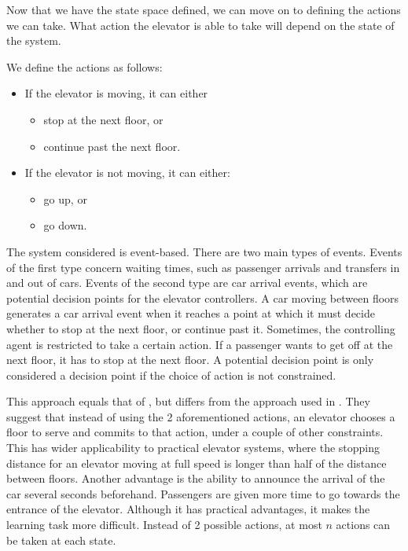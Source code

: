 Now that we have the state space defined, we can move on to defining the actions we can take. What action the elevator is able to take will depend on the state of the system.

We define the actions as follows:

\begin{itemize}
    \item If the elevator is moving, it can either
        \begin{itemize}
            \item stop at the next floor, or
            \item continue past the next floor.
        \end{itemize}

    \item If the elevator is not moving, it can either:
        \begin{itemize}
            \item go up, or
            \item go down.
        \end{itemize}
\end{itemize}

The system considered is event-based. There are two main types of events. Events of the first type concern waiting times, such as passenger arrivals and transfers in and out of cars. Events of the second type are car arrival events, which are potential decision points for the elevator controllers. A car moving between floors generates a car arrival event when it reaches a point at which it must decide whether to stop at the next floor, or continue past it. Sometimes, the controlling agent is restricted to take a certain action. If a passenger wants to get off at the next floor, it has to stop at the next floor. A potential decision point is only considered a decision point if the choice of action is not constrained.

This approach equals that of \cite{crites_barto_1998, crites_barto_group_1998}, but differs from the approach used in \cite{walczak2006}. They suggest that instead of using the 2 aforementioned actions, an elevator chooses a floor to serve and commits to that action, under a couple of other constraints. This has wider applicability to practical elevator systems, where the stopping distance for an elevator moving at full speed is longer than half of the distance between floors. Another advantage is the ability to announce the arrival of the car several seconds beforehand. Passengers are given more time to go towards the entrance of the elevator. Although it has practical advantages, it makes the learning task more difficult. Instead of 2 possible actions, at most $n$ actions can be taken at each state.

